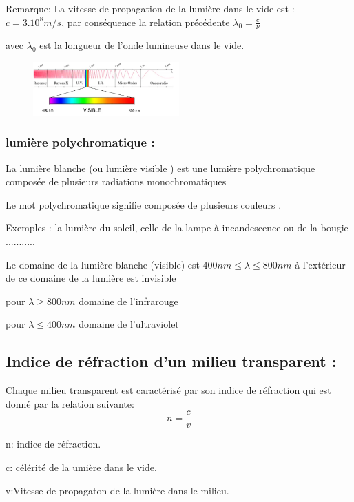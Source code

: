 \documentclass[12pt]{article}
\begin{document}
\begin{tcolorbox}
	Remarque: 
	La vitesse de propagation de la lumière dans le vide est : $c= 3.10^8m/s$, par conséquence la relation précédente $\lambda_0 = \frac{c}{\nu}$ 

	avec $\lambda_0$ est la longueur de l'onde lumineuse dans le vide.
\end{tcolorbox}
\begin{figure}
	\vspace{-1.5cm}
	\includegraphics[width=0.5\textwidth]{./img/OLpolyChromatique.png}
\end{figure}

\subsubsection{lumière polychromatique : }

La lumière blanche (ou lumière visible ) est une lumière polychromatique composée de plusieurs radiations monochromatiques

Le mot polychromatique signifie composée de plusieurs couleurs .

Exemples : la lumière du soleil, celle de la lampe à incandescence ou de la bougie ...........

Le domaine de la lumière blanche (visible) est $400nm \leq \lambda \leq 800nm$ à l'extérieur de ce domaine de la lumière est invisible 
 
pour $\lambda \geq 800nm$ domaine de l'infrarouge

pour $\lambda \leq 400nm$ domaine de l'ultraviolet

\subsection{Indice de réfraction d'un milieu transparent : }

Chaque milieu transparent est caractérisé par son indice de réfraction qui est donné par la relation suivante:$$n = \frac{c}{v}$$

n:  indice de réfraction.

c: célérité de la umière dans le vide.

v:Vitesse de propagaton de la lumière dans le milieu.
\end{document}
